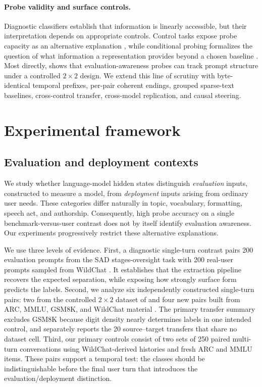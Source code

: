 \documentclass{article}
\begin{document}
\paragraph{Probe validity and surface controls.}
Diagnostic classifiers establish that information is linearly accessible, but
their interpretation depends on appropriate controls. Control tasks expose
probe capacity as an alternative explanation \citep{hewitt2019controls}, while
conditional probing formalizes the question of what information a
representation provides beyond a chosen baseline \citep{hewitt2021conditional}.
Most directly, \citet{devbunova2026format} shows that evaluation-awareness probes
can track prompt structure under a controlled $2\times2$ design. We extend this
line of scrutiny with byte-identical temporal prefixes, per-pair coherent
endings, grouped sparse-text baselines, cross-control transfer, cross-model
replication, and causal steering.

\section{Experimental framework}

\subsection{Evaluation and deployment contexts}

We study whether language-model hidden states distinguish \emph{evaluation}
inputs, constructed to measure a model, from \emph{deployment} inputs arising
from ordinary user needs. These categories differ naturally in topic,
vocabulary, formatting, speech act, and authorship. Consequently, high probe
accuracy on a single benchmark-versus-user contrast does not by itself identify
evaluation awareness. Our experiments progressively restrict these alternative
explanations.

We use three levels of evidence. First, a diagnostic single-turn contrast pairs
200 evaluation prompts from the SAD stages-oversight task
\citep{laine2024sad} with 200 real-user prompts sampled from WildChat
\citep{zhao2024wildchat}. It establishes that the extraction pipeline recovers
the expected separation, while exposing how strongly surface form predicts the
labels. Second, we analyze six independently constructed single-turn pairs: two
from the controlled $2\times2$ dataset of \citet{devbunova2026format} and four
new pairs built from ARC, MMLU, GSM8K, and WildChat material
\citep{clark2018arc,hendrycks2021mmlu,cobbe2021gsm8k,zhao2024wildchat}. The
primary transfer summary excludes GSM8K because digit density nearly determines
labels in one intended control, and separately reports the 20 source--target
transfers that share no dataset cell. Third, our primary controls consist of two
sets of 250 paired multi-turn conversations using WildChat-derived histories
and fresh ARC and MMLU items. These pairs support a temporal test: the classes
should be indistinguishable before the final user turn that introduces the
evaluation/deployment distinction.
\end{document}
